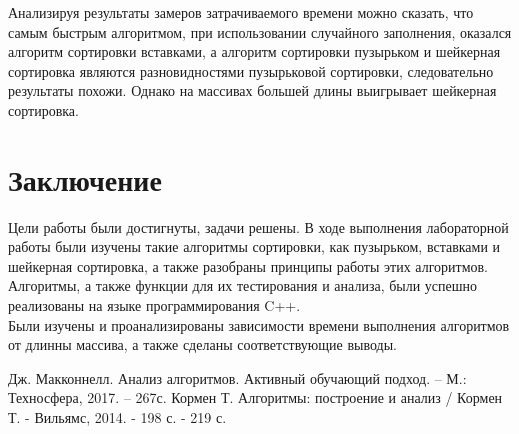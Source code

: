 \documentclass[12pt,a4paper]{report}
\begin{document}
Анализируя результаты замеров затрачиваемого времени можно сказать, что самым быстрым алгоритмом, при использовании 
случайного заполнения, оказался алгоритм сортировки вставками, а алгоритм сортировки пузырьком и шейкерная сортировка 
являются разновидностями пузырьковой сортировки, следовательно результаты похожи. 
Однако на массивах большей длины выигрывает шейкерная сортировка.

\newpage
\chapter*{Заключение}

Цели работы были достигнуты, задачи решены. В ходе выполнения лабораторной работы были изучены такие алгоритмы сортировки, как пузырьком, вставками и 
шейкерная сортировка, а также разобраны принципы работы этих алгоритмов. \\

Алгоритмы, а также функции для их тестирования и анализа, были успешно реализованы на языке программирования 
C++. \\

Были изучены и проанализированы зависимости времени выполнения алгоритмов от длинны массива, а также сделаны 
соответствующие выводы.

\newpage
\renewcommand\bibname{Список литературы}
\makeatletter %
\def\@biblabel#1{#1. }
\makeatother
\begin{thebibliography}{2}
     Дж. Макконнелл. Анализ алгоритмов. Активный обучающий подход. -- М.: Техносфера, 2017. -- 267с.
     Кормен Т. Алгоритмы: построение и анализ / Кормен Т. - Вильямс, 2014. - 198 с. - 219 с.
\end{thebibliography}
\end{document}
